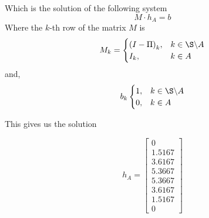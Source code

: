 Which is the solution of the following system
\[ M \cdot h_A = b \]
Where the $k$-th row of the matrix $M$ is
\[ M_k = \begin{cases}
    {(I-\Pi)}_k,& k\in \S \backslash A\\
    I_k,& k\in A
\end{cases} \]
and,
\[ b_k \begin{cases}
    1,& k\in \S \backslash A\\
    0,& k\in A
\end{cases} \]

This gives us the solution

\[ h_A = \left[\begin{matrix}0\\1.5167\\3.6167\\5.3667\\5.3667\\3.6167\\1.5167\\0\end{matrix}\right]
\]